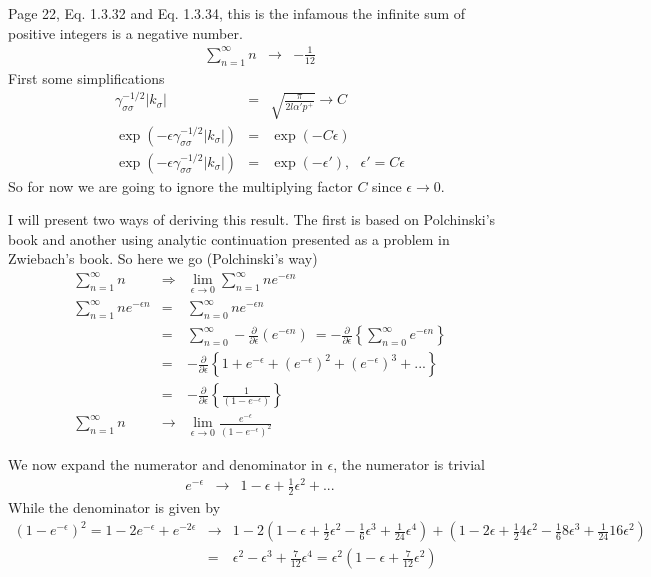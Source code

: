 \documentclass[aps,preprint,preprintnumbers,nofootinbib,showpacs,prd]{revtex4-1}
\newcommand{\nbea}{\begin{eqnarray*}}
\newcommand{\neea}{\end{eqnarray*}}
\begin{document}
Page 22, Eq. 1.3.32 and Eq. 1.3.34, this is the infamous the infinite sum of positive integers is a negative number. 
%
\nbea
\sum_{n=1}^{\infty} n & \rightarrow & -\frac{1}{12}
\neea
%
First some simplifications
%
\nbea
\gamma_{\sigma\sigma}^{-1/2} |k_\sigma| & = & \sqrt{\frac{\pi}{2l\alpha' p^+}} \rightarrow C \\
\exp(-\epsilon \gamma_{\sigma\sigma}^{-1/2} |k_\sigma|) & = & \exp(-C\epsilon) \\
\exp(-\epsilon \gamma_{\sigma\sigma}^{-1/2} |k_\sigma|) & = & \exp(-\epsilon'), ~~~ \epsilon' = C \epsilon
\neea
%
So for now we are going to ignore the multiplying factor $C$ since $\epsilon \rightarrow 0$.

I will present two ways of deriving this result. The first is based on Polchinski's book and another using analytic continuation presented as a problem in Zwiebach's book. So here we go (Polchinski's way)
%
\nbea
\sum_{n=1}^{\infty} n & \Longrightarrow & \lim_{\epsilon \rightarrow 0} \sum_{n=1}^{\infty} n e^{-\epsilon n} \\
\sum_{n=1}^{\infty} n e^{-\epsilon n} & = & \sum_{n=0}^{\infty} n e^{-\epsilon n} \\
& = & \sum_{n=0}^{\infty} -\frac{\partial}{\partial \epsilon} (e^{-\epsilon n}) ~ = -\frac{\partial}{\partial \epsilon} \left \{ \sum_{n=0}^{\infty}  e^{-\epsilon n} \right \} \\
& = & -\frac{\partial}{\partial \epsilon} \left \{ 1 + e^{-\epsilon} + (e^{-\epsilon})^2 + (e^{-\epsilon})^3 + ... \right \} \\
& = & -\frac{\partial}{\partial \epsilon} \left \{ \frac{1}{(1-e^{-\epsilon})} \right \} \\
\sum_{n=1}^{\infty} n & \rightarrow  & \lim_{\epsilon \rightarrow 0} \frac{e^{-\epsilon}}{(1-e^{-\epsilon})^2}
\neea
%

We now expand the numerator and denominator in $\epsilon$, the numerator is trivial
%
\nbea
e^{-\epsilon} & \rightarrow & 1 - \epsilon + \frac{1}{2} \epsilon^2 + ...
\neea
%
While the denominator is given by
%
\nbea
(1-e^{-\epsilon})^2 = 1 - 2e^{-\epsilon} + e^{-2\epsilon} & \rightarrow & 1 - 2 (1 - \epsilon + \frac{1}{2}\epsilon^2 - \frac{1}{6}\epsilon^3 + \frac{1}{24}\epsilon^4) + (1 - 2\epsilon + \frac{1}{2} 4 \epsilon^2 - \frac{1}{6} 8\epsilon^3 + \frac{1}{24}16\epsilon^2) \\
& = & \epsilon^2 - \epsilon^3 + \frac{7}{12} \epsilon^4  = \epsilon^2(1 - \epsilon + \frac{7}{12}\epsilon^2)
\neea
%
\end{document}
